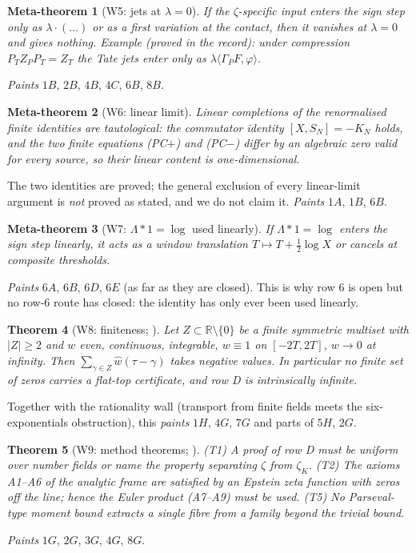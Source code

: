 \documentclass[11pt]{amsart}
\newtheorem{theorem}{Theorem}[section]
\newtheorem{metatheorem}[theorem]{Meta-theorem}
\theoremstyle{definition}
\theoremstyle{remark}
\newcommand{\R}{\mathbb R}
\begin{document}
\begin{metatheorem}[W5: jets at $\lambda=0$]\label{W5}
If the $\zeta$-specific input enters the sign step only as $\lambda\cdot(\dots)$ or as a first variation at
the contact, then it vanishes at $\lambda=0$ and gives nothing. Example (proved in the record): under
compression $P_TZ_PP_T=Z_T$ the Tate jets enter only as $\lambda\langle\Gamma_PF,\varphi\rangle$.
\end{metatheorem}
\noindent \emph{Paints} $1B$, $2B$, $4B$, $4C$, $6B$, $8B$.

\begin{metatheorem}[W6: linear limit]\label{W6}
Linear completions of the renormalised finite identities are tautological: the commutator identity
$[X,S_N]=-K_N$ holds, and the two finite equations (PC$+$) and (PC$-$) differ by an algebraic zero valid for
every source, so their linear content is one-dimensional.
\end{metatheorem}
\noindent The two identities are proved; the general exclusion of every linear-limit argument is
\emph{not} proved as stated, and we do not claim it. \emph{Paints} $1A$, $1B$, $6B$.

\begin{metatheorem}[W7: $\Lambda*1=\log$ used linearly]\label{W7}
If $\Lambda*1=\log$ enters the sign step linearly, it acts as a window translation $T\mapsto T+\frac12\log X$
or cancels at composite thresholds.
\end{metatheorem}
\noindent \emph{Paints} $6A$, $6B$, $6D$, $6E$ (as far as they are closed). This is why row 6 is open but no row-6
route has closed: the identity has only ever been used linearly.

\begin{theorem}[W8: finiteness; ]\label{thm:finZ}
Let $Z\subset\R\setminus\{0\}$ be a finite symmetric multiset with $|Z|\ge2$ and $w$ even, continuous,
integrable, $w\equiv1$ on $[-2T,2T]$, $w\to0$ at infinity. Then $\sum_{\gamma\in Z}\widehat w(\tau-\gamma)$
takes negative values. In particular no finite set of zeros carries a flat-top certificate, and row D is
intrinsically infinite.
\end{theorem}
\noindent Together with the rationality wall (transport from finite fields meets the six-exponentials
obstruction), this \emph{paints} $1H$, $4G$, $7G$ and parts of $5H$, $2G$.

\begin{theorem}[W9: method theorems; ]\label{W9}
(T1) A proof of row D must be uniform over number fields or name the property separating $\zeta$ from
$\zeta_K$. (T2) The axioms A1--A6 of the analytic frame are satisfied by an Epstein zeta function with
zeros off the line; hence the Euler product (A7--A9) must be used. (T5) No Parseval-type moment bound
extracts a single fibre from a family beyond the trivial bound.
\end{theorem}
\noindent \emph{Paints} $1G$, $2G$, $3G$, $4G$, $8G$.
\end{document}
